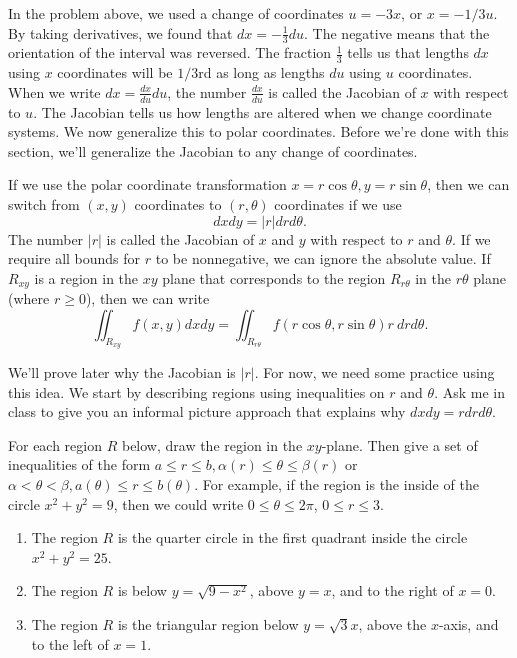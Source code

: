 In the problem above, we used a change of coordinates $u=-3x$, or $x=-1/3 u$.  By taking derivatives, we found that $dx=-\frac{1}{3}du$. The negative means that the orientation of the interval was reversed. The fraction $\frac13$ tells us that lengths $dx$ using $x$ coordinates will be $1/3$rd as long as lengths $du$ using $u$ coordinates. When we write $dx = \frac{dx}{du}du$, the number $\frac{dx}{du}$ is called the Jacobian of $x$ with respect to $u$. The Jacobian tells us how lengths are altered when we change coordinate systems. We now generalize this to polar coordinates. Before we're done with this section, we'll generalize the Jacobian to any change of coordinates.

\begin{theorem}
 If we use the polar coordinate transformation $x=r\cos\theta, y=r\sin\theta$, then we can switch from $(x,y)$ coordinates to $(r,\theta)$ coordinates if we use $$dxdy=|r|drd\theta.$$  The number $|r|$ is called the Jacobian of $x$ and $y$ with respect to $r$ and $\theta$. If we require all bounds for $r$ to be nonnegative, we can ignore the absolute value.  If $R_{xy}$ is a region in the $xy$ plane that corresponds to the region $R_{r\theta}$ in the $r\theta$ plane (where $r\geq 0$), then we can write $$\iint_{R_{xy}} f(x,y) dxdy = \iint_{R_{r\theta}} f(r\cos\theta,r\sin\theta) r\ drd\theta.$$ 
\end{theorem}
We'll prove later why the Jacobian is $|r|$.  For now, we need some practice using this idea. We start by describing regions using inequalities on $r$ and $\theta$.  Ask me in class to give you an informal picture approach that explains why 
$dxdy=rdrd\theta$.  



\begin{problem}
For each region $R$ below, draw the region in the $xy$-plane. Then give a set of inequalities of the form $a\leq r\leq b, \alpha(r)\leq \theta \leq \beta(r)$ or $\alpha<\theta<\beta, a(\theta)\leq r\leq b(\theta)$. For example, if the region is the inside of the circle $x^2+y^2=9$, then we could write $0\leq \theta\leq 2\pi$, $0\leq r\leq 3$. 
\begin{enumerate}
 \item The region $R$ is the quarter circle in the first quadrant inside the circle $x^2+y^2=25$.
 \item The region $R$ is below $y=\sqrt{9-x^2}$, above $y=x$, and to the right of $x=0$.  
 \item The region $R$ is the triangular region below $y=\sqrt 3 x$, above the $x$-axis, and to the left of $x=1$. 
\end{enumerate}
\end{problem}


